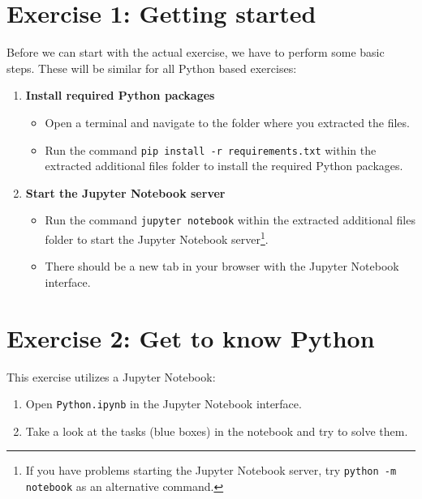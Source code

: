 \documentclass[
english,
smallborders
]{i6prcsht}
\begin{document}
\section*{Exercise 1: Getting started}

Before we can start with the actual exercise, we have to perform some basic steps. These will be similar for all Python based exercises:

\begin{enumerate}
	\item \textbf{Install required Python packages}

	      \begin{itemize}
		      \item Open a terminal and navigate to the folder where you extracted the files.
		      \item Run the command \texttt{pip install -r requirements.txt} within the extracted additional files
		            folder to install the required Python packages.
	      \end{itemize}

	\item \textbf{Start the Jupyter Notebook server}

	      \begin{itemize}
		      \item Run the command \texttt{jupyter notebook} within the extracted additional files
		            folder to start the Jupyter Notebook server\footnote{If you have problems starting the Jupyter Notebook server, try \texttt{python -m notebook} as an alternative command.}.
		      \item There should be a new tab in your browser with the Jupyter Notebook interface.
	      \end{itemize}
\end{enumerate}

\section*{Exercise 2: Get to know Python}

This exercise utilizes a Jupyter Notebook:

\begin{enumerate}
	\item Open \texttt{Python.ipynb} in the Jupyter Notebook interface.
	\item Take a look at the tasks (blue boxes) in the notebook and try to solve them.
\end{enumerate}
\end{document}
